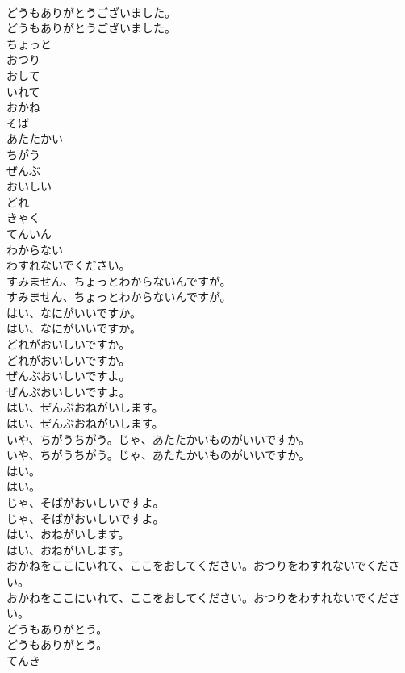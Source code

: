 \documentclass[8pt]{extreport}
\begin{document}
\begin{CJK}{UTF8}{min}
\\	どうもありがとうございました。	
\\	どうもありがとうございました。 
\\	ちょっと
\\	おつり
\\	おして
\\	いれて
\\	おかね
\\	そば
\\	あたたかい
\\	ちがう
\\	ぜんぶ
\\	おいしい
\\	どれ
\\	きゃく
\\	てんいん
\\	わからない
\\	わすれないでください。
\\	すみません、ちょっとわからないんですが。	
\\	すみません、ちょっとわからないんですが。 
\\	はい、なにがいいですか。	
\\	はい、なにがいいですか。 
\\	どれがおいしいですか。	
\\	どれがおいしいですか。 
\\	ぜんぶおいしいですよ。	
\\	ぜんぶおいしいですよ。 
\\	はい、ぜんぶおねがいします。	
\\	はい、ぜんぶおねがいします。 
\\	いや、ちがうちがう。じゃ、あたたかいものがいいですか。	
\\	いや、ちがうちがう。じゃ、あたたかいものがいいですか。 
\\	はい。	
\\	はい。 
\\	じゃ、そばがおいしいですよ。	
\\	じゃ、そばがおいしいですよ。 
\\	はい、おねがいします。	
\\	はい、おねがいします。 
\\	おかねをここにいれて、ここをおしてください。おつりをわすれないでください。	
\\	おかねをここにいれて、ここをおしてください。おつりをわすれないでください。 
\\	どうもありがとう。	
\\	どうもありがとう。 
\\	てんき

\end{CJK}
\end{document}
